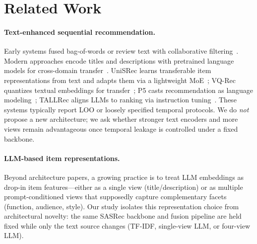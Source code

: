 \documentclass[sigconf,natbib=true,anonymous]{acmart}
\newcommand{\tfidf}{\textsc{TF-IDF}\xspace}
\newcommand{\llm}{\textsc{LLM}\xspace}
\begin{document}
\section{Related Work}
\label{sec:related}

\paragraph{Text-enhanced sequential recommendation.}
Early systems fused bag-of-words or review text with collaborative filtering~\cite{wang2015cdl,salton1988termweighting}.
Modern approaches encode titles and descriptions with pretrained language models for cross-domain transfer~\cite{hou2022unisrec,hou2023vqrec,geng2022p5,bao2023tallrec}.
UniSRec learns transferable item representations from text and adapts them via a lightweight MoE~\cite{hou2022unisrec}; VQ-Rec quantizes textual embeddings for transfer~\cite{hou2023vqrec}; P5 casts recommendation as language modeling~\cite{geng2022p5}; TALLRec aligns LLMs to ranking via instruction tuning~\cite{bao2023tallrec}.
These systems typically report LOO or loosely specified temporal protocols.
We do \emph{not} propose a new architecture; we ask whether stronger text encoders and more views remain advantageous once temporal leakage is controlled under a fixed backbone.

\paragraph{LLM-based item representations.}
Beyond architecture papers, a growing practice is to treat LLM embeddings as drop-in item features---either as a single view (title/description) or as multiple prompt-conditioned views that supposedly capture complementary facets (function, audience, style).
Our study isolates this representation choice from architectural novelty: the same SASRec backbone and fusion pipeline are held fixed while only the text source changes (\tfidf, single-view \llm, or four-view \llm).
\end{document}
